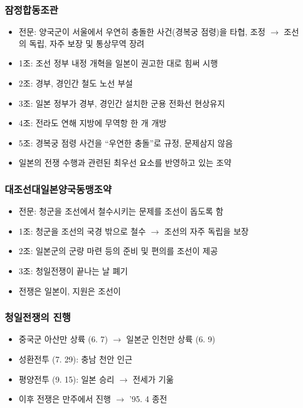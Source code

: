 \subsubsection*{잠정합동조관}
\begin{itemize}
    \item 전문: 양국군이 서울에서 우연히 충돌한 사건(경복궁 점령)을 타협, 조정 $\rightarrow$ 조선의 독립, 자주 보장 및 통상무역 장려
    \item 1조: 조선 정부 내정 개혁을 일본이 권고한 대로 힘써 시행
    \item 2조: 경부, 경인간 철도 노선 부설
    \item 3조: 일본 정부가 경부, 경인간 설치한 군용 전화선 현상유지
    \item 4조: 전라도 연해 지방에 무역항 한 개 개방
    \item 5조: 경복궁 점령 사건을 ``우연한 충돌''로 규정, 문제삼지 않음
    \item 일본의 전쟁 수행과 관련된 최우선 요소를 반영하고 있는 조약
\end{itemize}

\subsubsection*{대조선대일본양국동맹조약}
\begin{itemize}
    \item 전문: 청군을 조선에서 철수시키는 문제를 조선이 돕도록 함
    \item 1조: 청군을 조선의 국경 밖으로 철수 $\rightarrow$ 조선의 자주 독립을 보장
    \item 2조: 일본군의 군량 마련 등의 준비 및 편의를 조선이 제공
    \item 3조: 청일전쟁이 끝나는 날 폐기
    \item 전쟁은 일본이, 지원은 조선이
\end{itemize}

\subsubsection*{청일전쟁의 진행}
\begin{itemize}
    \item 중국군 아산만 상륙 (6. 7) $\rightarrow$ 일본군 인천만 상륙 (6. 9)
    \item 성환전투 (7. 29): 충남 천안 인근
    \item 평양전투 (9. 15): 일본 승리 $\rightarrow$ 전세가 기욺
    \item 이후 전쟁은 만주에서 진행 $\rightarrow$ '95. 4 종전
\end{itemize}

